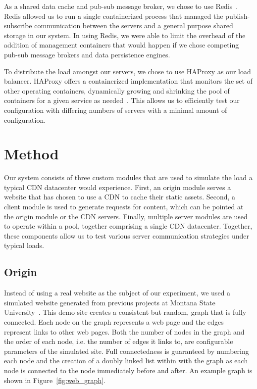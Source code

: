 \documentclass[conference]{IEEEtran}
\begin{document}
As a shared data cache and pub-sub message broker, we chose to use Redis~\cite{redis}.  Redis allowed us to run a single containerized process that managed the publish-subscribe communication between the servers and a general purpose shared storage in our system. In using Redis, we were able to limit the overhead of the addition of management containers that would happen if we chose competing pub-sub message brokers and data persistence engines.

To distribute the load amongst our servers, we chose to use HAProxy as our load balancer.  HAProxy offers a containerized implementation that monitors the set of other operating containers, dynamically growing and shrinking the pool of containers for a given service as needed~\cite{haproxy}.  This allows us to efficiently test our configuration with differing numbers of servers with a minimal amount of configuration.

\section{Method}\label{sec:method}
Our system consists of three custom modules that are used to simulate the load a typical CDN datacenter would experience.  First, an origin module serves a website that has chosen to use a CDN to cache their static assets.  Second, a client module is used to generate requests for content, which can be pointed at the origin module or the CDN servers.  Finally, multiple server modules are used to operate within a pool, together comprising a single CDN datacenter.  Together, these components allow us to test various server communication strategies under typical loads.
\subsection*{Origin}


Instead of using a real website as the subject of our experiment, we used a simulated website generated from previous projects at Montana State University~\cite{pipelines}.  This demo site creates a consistent but random, graph that is fully connected.  Each node on the graph represents a web page and the edges represent links to other web pages.  Both the number of nodes in the graph and the order of each node, i.e. the number of edges it links to, are configurable parameters of the simulated site.  Full connectedness is guaranteed by numbering each node and the creation of a doubly linked list within with the graph as each node is connected to the node immediately before and after. An example graph is shown in Figure~\ref{fig:web_graph}.
\end{document}
